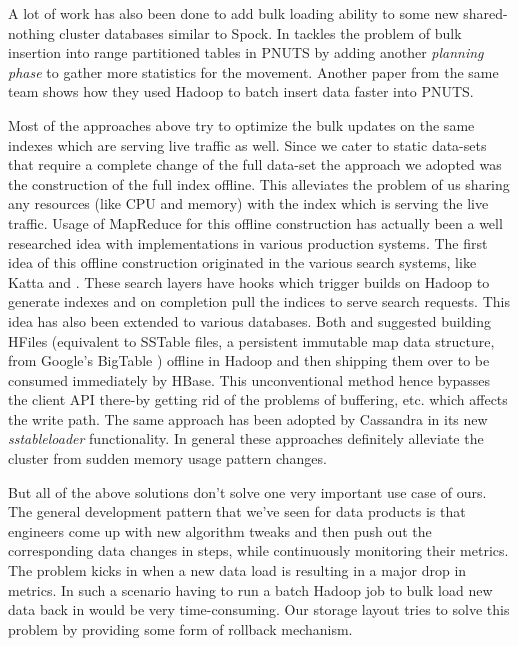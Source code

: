 \documentclass[twocolumn]{article}
\newcommand{\projectname}{Spock}
\begin{document}
A lot of work has also been done to add bulk loading ability to some new shared-nothing cluster\cite{sharednothing} databases similar to \projectname{}. In \cite{silberstein} tackles the problem of bulk insertion into range partitioned tables in PNUTS \cite{pnuts} by adding another \emph {planning phase} to gather more statistics for the movement. Another paper from the same team \cite{pnutsbatch} shows how they used Hadoop to batch insert data faster into PNUTS.

Most of the approaches above try to optimize the bulk updates on the same indexes which are serving live traffic as well. Since we cater to static data-sets that require a complete change of the full data-set the approach we adopted was the construction of the full index offline. This alleviates the problem of us sharing any resources (like CPU and memory) with the index which is serving the live traffic. Usage of MapReduce for this offline construction has actually been a well researched idea with implementations in various production systems. The first idea of this offline construction originated in the various search systems, like Katta\cite{katta} and \cite{mika}. These search layers have hooks which trigger builds on Hadoop to generate indexes and on completion pull the indices to serve search requests. This idea has also been extended to various databases. Both \cite{konstantinou} and \cite{barbuzzi} suggested building HFiles (equivalent to SSTable files, a persistent immutable map data structure, from Google's BigTable \cite{bigtable}) offline in Hadoop and then shipping them over to be consumed immediately by HBase\cite{hbase}. This unconventional method hence bypasses the client API there-by getting rid of the problems of buffering, etc. which affects the write path. The same approach has been adopted by Cassandra\cite{cassandra} in its new \emph{sstableloader}\cite{cassandra_bulk} functionality. In general these approaches definitely alleviate the cluster from sudden memory usage pattern changes. 

But all of the above solutions don't solve one very important use case of ours. The general development pattern that we've seen for data products is that engineers come up with new algorithm tweaks and then push out the corresponding data changes in steps, while continuously monitoring their metrics. The problem kicks in when a new data load is resulting in a major drop in metrics. In such a scenario having to run a batch Hadoop job to bulk load new data back in would be very time-consuming. Our storage layout tries to solve this problem by providing some form of rollback mechanism. 
 
\end{document}
